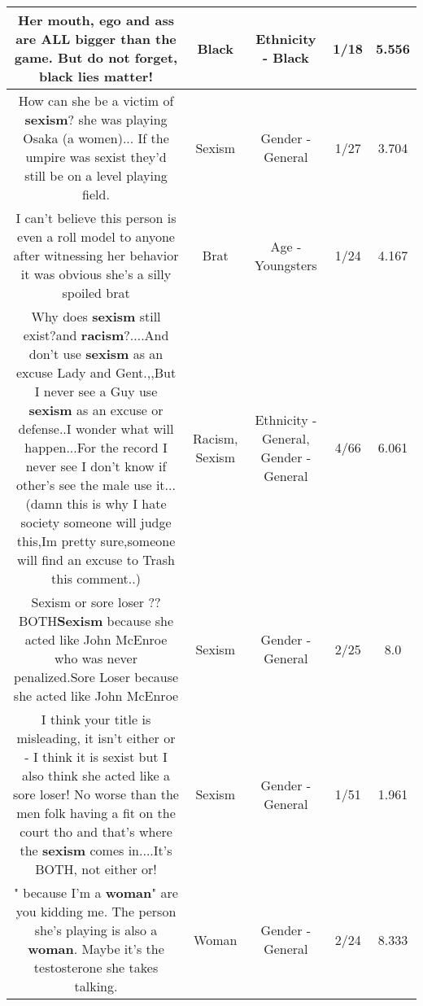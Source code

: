 \documentclass[11pt]{article}
\newlength\mylength
\begin{document}
\begin{center}
\begin{longtable}{|C{.65\mylength}|C{.30\mylength}|C{.12\mylength}|C{.12\mylength}|C{.12\mylength}|}
  \small Her mouth, ego and ass are ALL bigger than the game. But do not forget, \textbf{black} lies matter!\normalsize   & Black & Ethnicity - Black & 1/18 & 5.556 \\  \hline
  \small How can she be a victim of \textbf{sexism}? she was playing Osaka (a women)... If the umpire was sexist they'd still be on a level playing field.\normalsize   & Sexism & Gender - General & 1/27 & 3.704 \\  \hline
  \small I can't believe this person is even a roll model to anyone after witnessing her behavior it was obvious she's a silly spoiled brat\normalsize   & Brat & Age - Youngsters & 1/24 & 4.167 \\  \hline
  \small Why does \textbf{sexism} still exist?and \textbf{racism}?....And don't use \textbf{sexism} as an excuse Lady and Gent.,,But I never see a Guy use \textbf{sexism} as an excuse or defense..I wonder what will happen...For the record I never see I don't know if other's see the male use it...(damn this is why I hate society someone will judge this,Im pretty sure,someone will find an excuse to Trash this comment..)\normalsize   & Racism, Sexism & Ethnicity - General, Gender - General & 4/66 & 6.061 \\  \hline
  \small Sexism or sore loser ??  BOTH\textbf{Sexism} because she acted like John McEnroe who was never penalized.Sore Loser because she acted like John McEnroe\normalsize   & Sexism & Gender - General & 2/25 & 8.0 \\  \hline
  \small I think your title is misleading, it isn't either or - I think it is sexist but I also think she acted like a sore loser! No worse than the men folk having a fit on the court tho and that's where the \textbf{sexism} comes in....It's BOTH, not either or!\normalsize   & Sexism & Gender - General & 1/51 & 1.961 \\  \hline
  \small " because I'm a \textbf{woman}" are you kidding me. The person she's playing is also a \textbf{woman}. Maybe it's the testosterone she takes talking.\normalsize   & Woman & Gender - General & 2/24 & 8.333 \\  \hline

\end{longtable}
\end{center}
\end{document}
